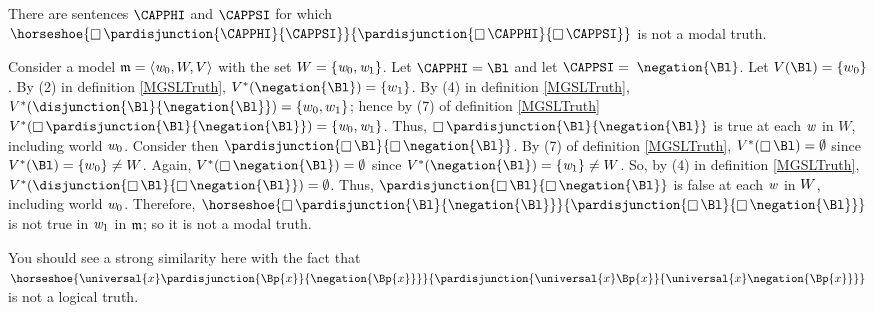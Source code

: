 \begin{majorILnc}{}
There are sentences $\CAPPHI$ and $\CAPPSI$ for which $\horseshoe{\BOX\pardisjunction{\CAPPHI}{\CAPPSI}}{\pardisjunction{\BOX\CAPPHI}{\BOX\CAPPSI}}$ is not a modal truth. 
\end{majorILnc}
\begin{PROOF}
Consider a model $\mathfrak{m}=\langle\mathit{w}_0,W,V\rangle$ with the set $W=\{\mathit{w}_0,\mathit{w}_1\}$. 
Let $\CAPPHI=\Bl$ and let $\CAPPSI=\;\negation{\Bl}$. 
Let $\integer{V}(\Bl)=\{w_0\}$. 
By (2) in definition \ref{MGSLTruth}, $\integer{V}^*(\negation{\Bl})=\{w_1\}$. 
By (4) in definition \ref{MGSLTruth}, $\integer{V}^*(\disjunction{\Bl}{\negation{\Bl}})=\{w_0,w_1\}$; hence by (7) of definition \ref{MGSLTruth} $\integer{V}^*(\BOX\pardisjunction{\Bl}{\negation{\Bl}})=\{\world{w}_0,\world{w}_1\}$. 
Thus, $\BOX\pardisjunction{\Bl}{\negation{\Bl}}$ is true at each $\mathit{w}$ in $W$, including world $\mathit{w}_0$. 
Consider then $\pardisjunction{\BOX\Bl}{\BOX\negation{\Bl}}$. 
By (7) of definition \ref{MGSLTruth}, $\integer{V}^*(\BOX\Bl)=\emptyset$ since $\integer{V}^*(\Bl)=\{w_0\}\neq\integer{W}$. 
Again, $\integer{V}^*(\BOX\negation{\Bl})=\emptyset$ since $\integer{V}^*(\negation{\Bl})=\{\world{w}_1\}\neq\integer{W}$. 
So, by (4) in definition \ref{MGSLTruth}, $\integer{V}^*(\disjunction{\BOX\Bl}{\BOX\negation{\Bl}})=\emptyset$. Thus, $\pardisjunction{\BOX\Bl}{\BOX\negation{\Bl}}$ is false at each $\mathit{w}$ in $W$, including world $\mathit{w}_0$. 
Therefore, $\horseshoe{\BOX\pardisjunction{\Bl}{\negation{\Bl}}}{\pardisjunction{\BOX\Bl}{\BOX\negation{\Bl}}}$ is not true in $\mathit{w}_1$ in $\mathfrak{m}$; so it is not a modal truth. 
\end{PROOF}

You should see a strong similarity here with the fact that $\horseshoe{\universal{\variable{x}}\pardisjunction{\Bp{\variable{x}}}{\negation{\Bp{\variable{x}}}}}{\pardisjunction{\universal{\variable{x}}\Bp{\variable{x}}}{\universal{\variable{x}}\negation{\Bp{\variable{x}}}}}$ is not a logical truth.

